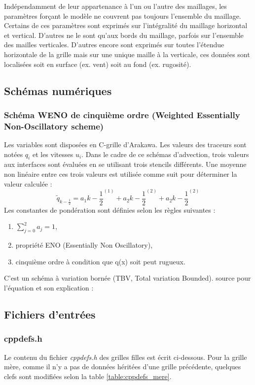 \documentclass[10pt,a4paper,titlepage]{article}
\begin{document}
Indépendamment de leur appartenance à l'un ou l'autre des maillages, les paramètres forçant le modèle ne couvrent pas toujours l'ensemble du maillage.
Certains de ces paramètres sont exprimés sur l'intégralité du maillage horizontal et vertical.
D'autres ne le sont qu'aux bords du maillage, parfois sur l'ensemble des mailles verticales.
D'autres encore sont exprimés sur toutes l'étendue horizontale de la grille mais sur une unique maille à la verticale, ces données sont localisées soit en surface (ex. vent) soit au fond (ex. rugosité).


\subsection{Schémas numériques}
\subsubsection{Schéma WENO de cinquième ordre (Weighted Essentially Non-Oscillatory scheme)}\label{anx:WENO}
Les variables sont disposées en C-grille d'Arakawa.
Les valeurs des traceurs sont notées $q_i$ et les vitesses $u_i$.
Dans le cadre de ce schémas d'advection, trois valeurs aux interfaces sont évaluées en se utilisant trois stencils différents. Une moyenne non linéaire entre ces trois valeurs est utilisée comme suit pour déterminer la valeur calculée :
$$\tilde{q}_{k-\frac{1}{2}} = a_1k-\frac{1}{2}^{(1)} + a_2k-\frac{1}{2}^{(2)} + a_2k-\frac{1}{2}^{(2)}$$
Les constantes de pondération sont définies selon les règles suivantes :
\begin{enumerate}
    \item $\sum_{j=0}^{2}a_j = 1$,
    \item propriété ENO (Essentially Non Oscillatory),
    \item cinquième ordre à condition que q(x) soit peut rugueux.
\end{enumerate}
C'est un schéma à variation bornée (TBV, Total variation Bounded).
source pour l'équation et son explication : \cite{schemas_advection}


\subsection{Fichiers d'entrées}
\subsubsection{cppdefs.h}
\label{anx:cppdefs}
Le contenu du fichier \textit{cppdefs.h} des grilles filles est écrit ci-dessous. Pour la grille mère, comme il n'y a pas de données héritées d'une grille précédente, quelques clefs sont modifiées selon la table \ref{table:cppdefs_mere}.
\end{document}
